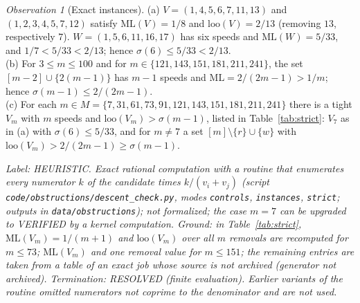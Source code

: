 \documentclass[11pt]{article}
\theoremstyle{remark}
\newtheorem{observation}[theorem]{Observation}
\newcommand{\ML}{\mathrm{ML}}
\newcommand{\loo}{\mathrm{loo}}
\newcommand{\lab}[1]{\par\smallskip\noindent\textit{Label: #1.}}
\begin{document}
\begin{observation}[Exact instances]\label{obs:inst}
(a) $V=(1,4,5,6,7,11,13)$ and $(1,2,3,4,5,7,12)$ satisfy $\ML(V)=1/8$ and $\loo(V)=2/13$ (removing $13$, respectively $7$). $W=(1,5,6,11,16,17)$ has six speeds and $\ML(W)=5/33$, and $1/7<5/33<2/13$; hence $\sigma(6)\le5/33<2/13$.\\
(b) For $3\le m\le100$ and for $m\in\{121,143,151,181,211,241\}$, the set $[m-2]\cup\{2(m-1)\}$ has $m-1$ speeds and $\ML=2/(2m-1)>1/m$; hence $\sigma(m-1)\le2/(2m-1)$.\\
(c) For each $m\in M=\{7,31,61,73,91,121,143,151,181,211,241\}$ there is a tight $V_m$ with $m$ speeds and $\loo(V_m)>\sigma(m-1)$, listed in Table~\ref{tab:strict}: $V_7$ as in (a) with $\sigma(6)\le5/33$, and for $m\ne7$ a set $[m]\setminus\{r\}\cup\{w\}$ with $\loo(V_m)>2/(2m-1)\ge\sigma(m-1)$.
\end{observation}
\lab{HEURISTIC. Exact rational computation with a routine that enumerates every numerator $k$ of the candidate times $k/(v_i+v_j)$ (script \texttt{code/obstructions/descent\_check.py}, modes \texttt{controls}, \texttt{instances}, \texttt{strict}; outputs in \texttt{data/obstructions}); not formalized; the case $m=7$ can be upgraded to VERIFIED by a kernel computation. Ground: in Table~\ref{tab:strict}, $\ML(V_m)=1/(m+1)$ and $\loo(V_m)$ over all $m$ removals are recomputed for $m\le73$; $\ML(V_m)$ and one removal value for $m\le151$; the remaining entries are taken from a table of an exact job whose source is not archived (generator not archived). Termination: RESOLVED (finite evaluation). Earlier variants of the routine omitted numerators not coprime to the denominator and are not used}
\end{document}
